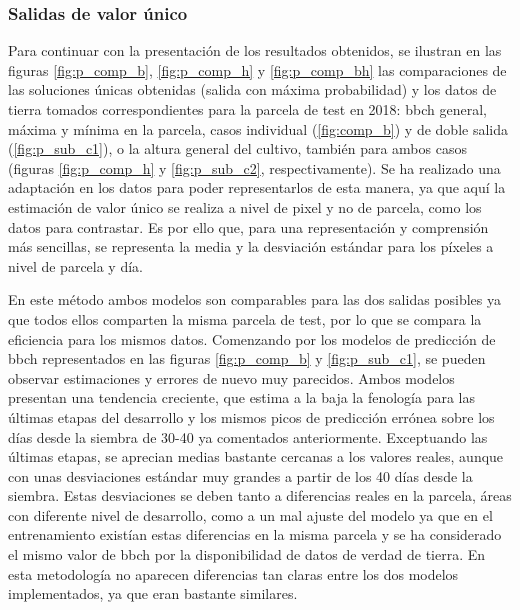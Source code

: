 \subsubsection{Salidas de valor único}
\par Para continuar con la presentación de los resultados obtenidos, se ilustran en las figuras \ref{fig:p_comp_b}, \ref{fig:p_comp_h} y \ref{fig:p_comp_bh} las comparaciones de las soluciones únicas obtenidas (salida con máxima probabilidad) y los datos de tierra tomados correspondientes para la parcela de test en 2018: \gls{bbch} general, máxima y mínima en la parcela, casos individual (\ref{fig:comp_b}) y de doble salida (\ref{fig:p_sub_c1}), o la altura general del cultivo, también para ambos casos (figuras \ref{fig:p_comp_h} y \ref{fig:p_sub_c2}, respectivamente). Se ha realizado una adaptación en los datos para poder representarlos de esta manera, ya que aquí la estimación de valor único se realiza a nivel de pixel y no de parcela, como los datos para contrastar. Es por ello que, para una representación y comprensión más sencillas, se representa la media y la desviación estándar para los píxeles a nivel de parcela y día. 
\\
\par En este método ambos modelos son comparables para las dos salidas posibles ya que todos ellos comparten la misma parcela de test, por lo que se compara la eficiencia para los mismos datos. Comenzando por los modelos de predicción de \gls{bbch} representados en las figuras \ref{fig:p_comp_b} y \ref{fig:p_sub_c1}, se pueden observar estimaciones y errores de nuevo muy parecidos. Ambos modelos presentan una tendencia creciente, que estima a la baja la fenología para las últimas etapas del desarrollo y los mismos picos de predicción errónea sobre los días desde la siembra de 30-40 ya comentados anteriormente. Exceptuando las últimas etapas, se aprecian medias bastante cercanas a los valores reales, aunque con unas desviaciones estándar muy grandes a partir de los 40 días desde la siembra. Estas desviaciones se deben tanto a diferencias reales en la parcela, áreas con diferente nivel de desarrollo, como a un mal ajuste del modelo ya que en el entrenamiento existían estas diferencias en la misma parcela y se ha considerado el mismo valor de \gls{bbch} por la disponibilidad de datos de verdad de tierra. En esta metodología no aparecen diferencias tan claras entre los dos modelos implementados, ya que eran bastante similares. 
\\
